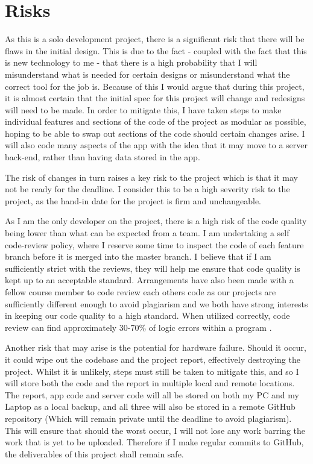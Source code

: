 \chapter{Risks}
As this is a solo development project, there is a significant risk that there will be flaws in the initial design. 
This is due to the fact - coupled with the fact that this is new technology to me - that there is a high probability that I will misunderstand what is needed for certain designs or misunderstand what the correct tool for the job is.
Because of this I would argue that during this project, it is almost certain that the initial spec for this project will change and redesigns will need to be made. 
In order to mitigate this, I have taken steps to make individual features and sections of the code of the project as modular as possible, hoping to be able to swap out sections of the code should certain changes arise.
I will also code many aspects of the app with the idea that it may move to a server back-end, rather than having data stored in the app. 
 
The risk of changes in turn raises a key risk to the project which is that it may not be ready for the deadline. 
I consider this to be a high severity risk to the project, as the hand-in date for the project is firm and unchangeable. 

As I am the only developer on the project, there is a high risk of the code quality being lower than what can be expected from a team.
I am undertaking a self code-review policy, where I reserve some time to inspect the code of each feature branch before it is merged into the master branch.
I believe that if I am sufficiently strict with the reviews, they will help me ensure that code quality is kept up to an acceptable standard.
Arrangements have also been made with a fellow course member to code review each others code as our projects are sufficiently different enough to avoid plagiarism and we both have strong interests in keeping our code quality to a high standard.
When utilized correctly, code review can find approximately 30-70\% of logic errors within a program \citep{myers2011art}.

Another risk that may arise is the potential for hardware failure. 
Should it occur, it could wipe out the codebase and the project report, effectively destroying the project. 
Whilst it is unlikely, steps must still be taken to mitigate this, and so I will store both the code and the report in multiple local and remote locations.
The report, app code and server code will all be stored on both my PC and my Laptop as a local backup, and all three will also be stored in a remote GitHub repository (Which will remain private until the deadline to avoid plagiarism).
This will ensure that should the worst occur, I will not lose any work barring the work that is yet to be uploaded.
Therefore if I make regular commits to GitHub, the deliverables of this project shall remain safe. 